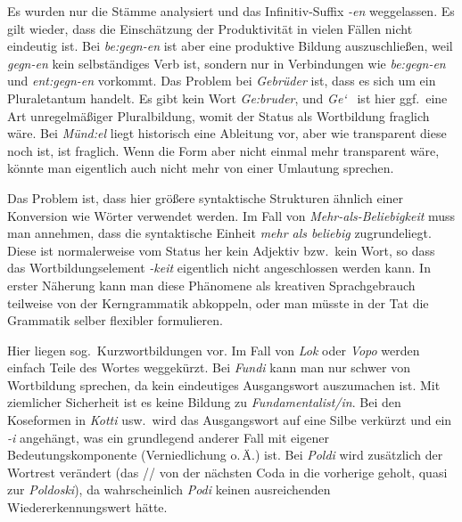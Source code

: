 \begin{sloppypar}

Es wurden nur die Stämme analysiert und das Infinitiv-Suffix \textit{-en} weggelassen.
Es gilt wieder, dass die Einschätzung der Produktivität in vielen Fällen nicht eindeutig ist.
Bei \textit{be:gegn-en} ist aber \zB eine produktive Bildung auszuschließen, weil \textit{gegn-en} kein selbständiges Verb ist, sondern nur in Verbindungen wie \textit{be:gegn-en} und \textit{ent:gegn-en} vorkommt.
Das Problem bei \textit{Gebrüder} ist, dass es sich um ein Pluraletantum handelt.
Es gibt kein Wort \textit{\Ast Ge:bruder}, und \textit{Ge\char`~} ist hier ggf.\ eine Art unregelmäßiger Pluralbildung, womit der Status als Wortbildung fraglich wäre.
Bei \textit{Münd:el} liegt historisch eine Ableitung vor, aber wie transparent diese noch ist, ist fraglich.
Wenn die Form aber nicht einmal mehr transparent wäre, könnte man eigentlich auch nicht mehr von einer Umlautung sprechen.

\end{sloppypar}

\label{sol:wortbildung03}

Das Problem ist, dass hier größere syntaktische Strukturen ähnlich einer Konversion wie Wörter verwendet werden.
Im Fall von \textit{Mehr-als-Beliebigkeit} muss man \zB annehmen, dass die syntaktische Einheit \textit{mehr als beliebig} zugrundeliegt.
Diese ist normalerweise vom Status her kein Adjektiv bzw.\ kein Wort, so dass das Wortbildungselement \textit{-keit} eigentlich nicht angeschlossen werden kann.
In erster Näherung kann man diese Phänomene als kreativen Sprachgebrauch teilweise von der Kerngrammatik abkoppeln, oder man müsste in der Tat die Grammatik selber flexibler formulieren.

\label{sol:wortbildung04}

Hier liegen sog.\ Kurzwortbildungen vor.
Im Fall von \textit{Lok} oder \textit{Vopo} werden einfach Teile des Wortes weggekürzt.
Bei \textit{Fundi} kann man nur schwer von Wortbildung sprechen, da kein eindeutiges Ausgangswort auszumachen ist.
Mit ziemlicher Sicherheit ist es keine Bildung zu \textit{Fundamentalist\slash in}.
Bei den Koseformen in \textit{Kotti} usw.\ wird das Ausgangswort auf eine Silbe verkürzt und ein \textit{-i} angehängt, was ein grundlegend anderer Fall mit eigener Bedeutungskomponente (Verniedlichung o.\,Ä.) ist.
Bei \textit{Poldi} wird zusätzlich der Wortrest verändert (das // von der nächsten Coda in die vorherige geholt, quasi zur \textit{Poldoski}), da wahrscheinlich \textit{Podi} keinen ausreichenden Wiedererkennungswert hätte.

